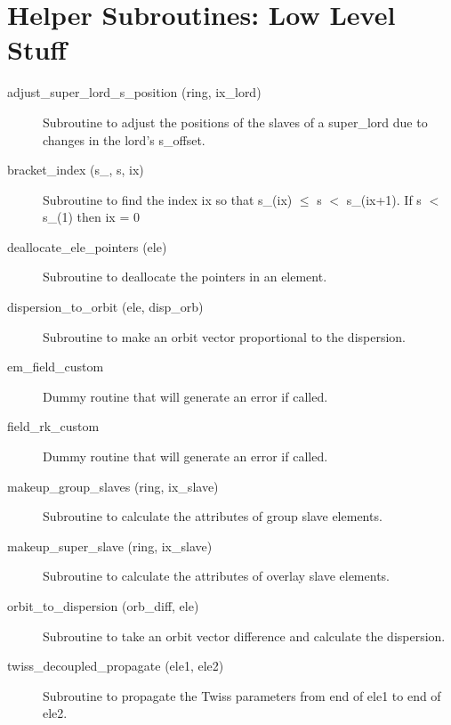 \section{Helper Subroutines: Low Level Stuff}
\label{r:low_help} 

\begin{description}

\item[adjust\_super\_lord\_s\_position (ring, ix\_lord)] \Newline
Subroutine to adjust the positions of the slaves of a 
super\_lord due to changes in the lord's s\_offset. 

\item[bracket\_index (s\_, s, ix)] \Newline
Subroutine to find the index ix so that s\_(ix) $\le$ s $<$ s\_(ix+1). 
If s $<$ s\_(1) then ix = 0 

\item[deallocate\_ele\_pointers (ele)] \Newline
Subroutine to deallocate the pointers in an element. 

\item[dispersion\_to\_orbit (ele, disp\_orb)] \Newline
Subroutine to make an orbit vector proportional to the dispersion. 

\item[em\_field\_custom] \Newline
Dummy routine that will generate an error if called. 

\item[field\_rk\_custom] \Newline
Dummy routine that will generate an error if called. 

\item[makeup\_group\_slaves (ring, ix\_slave)] \Newline
Subroutine to calculate the attributes of group slave elements.

\item[makeup\_super\_slave (ring, ix\_slave)] \Newline
Subroutine to calculate the attributes of overlay slave elements. 

\item[orbit\_to\_dispersion (orb\_diff, ele)] \Newline
Subroutine to take an orbit vector difference and calculate the dispersion. 

\item[twiss\_decoupled\_propagate (ele1, ele2)] \Newline
Subroutine to propagate the Twiss parameters from end of ele1 to end of ele2. 

\end{description}

